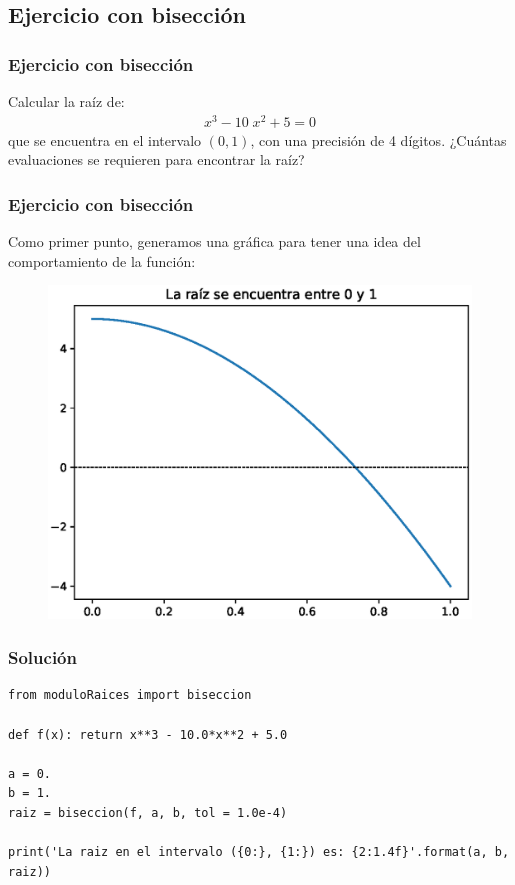 \documentclass[12pt]{beamer}
\begin{document}
\subsection{Ejercicio con bisección}

\begin{frame}[fragile]
\frametitle{Ejercicio con bisección}
Calcular la raíz de:
\begin{align*}
x^{3} - 10 \; x^{2} + 5 = 0
\end{align*}
que se encuentra en el intervalo $(0, 1)$, con una precisión de 4 dígitos. \pause ¿Cuántas evaluaciones se requieren para encontrar la raíz?
\end{frame}
\begin{frame}[fragile]
\frametitle{Ejercicio con bisección}
Como primer punto, generamos una gráfica para tener una idea del comportamiento de la función:
\pause
\begin{figure}
	\centering
	\includegraphics[scale=0.455]{Imagenes/Ejercicio_4_2_Libro.eps}
\end{figure}
\end{frame}
\begin{frame}
\frametitle{Solución}
\begin{lstlisting}[caption=Solución al ejercicio]
from moduloRaices import biseccion

def f(x): return x**3 - 10.0*x**2 + 5.0

a = 0.
b = 1.
raiz = biseccion(f, a, b, tol = 1.0e-4)

print('La raiz en el intervalo ({0:}, {1:}) es: {2:1.4f}'.format(a, b, raiz))
\end{lstlisting}
\end{frame}
\end{document}

